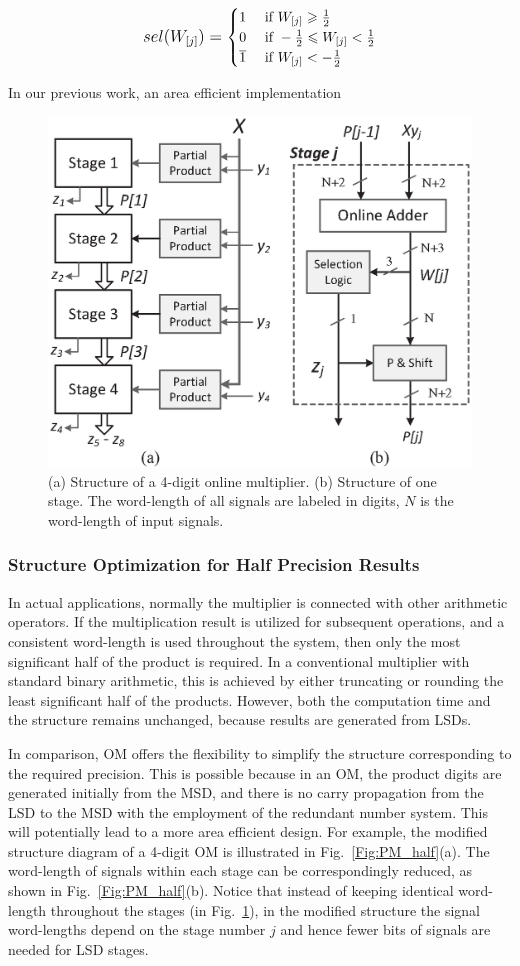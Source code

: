 \documentclass[10pt, conference, compsocconf]{IEEEtran}
\begin{document}
\begin{eqnarray}\label{Eq:SelFunc_OM}
\small
  sel(W_{[j]})=\begin{cases}
    1 & \text{ if } W_{[j]} \geqslant \frac{1}{2} \\
    0 & \text{ if } -\frac{1}{2}\leqslant W_{[j]}<\frac{1}{2} \\
    \overline{1} & \text{ if } W_{[j]}<-\frac{1}{2}
  \end{cases}
\normalsize
\end{eqnarray}

In our previous work, an area efficient implementation 

\begin{figure}[tbp]
  \centering
  \includegraphics[width=.42\textwidth]{./figures/ParallelMult_Structure.eps}
  \caption{(a) Structure of a 4-digit online multiplier. (b) Structure of one stage. The word-length of all signals are labeled in digits, $N$ is the word-length of input signals.}
    \vspace{-2ex}
  \label{Fig:PM}
\end{figure}

\subsubsection{Structure Optimization for Half Precision Results}
In actual applications, normally the multiplier is connected with other arithmetic operators. If the multiplication result is utilized for subsequent operations, and a consistent word-length is used throughout the system, then only the most significant half of the product is required. In a conventional multiplier with standard binary arithmetic, this is achieved by either truncating or rounding the least significant half of the products. However, both the computation time and the structure remains unchanged, because results are generated from LSDs.

In comparison, OM offers the flexibility to simplify the structure corresponding to the required precision. This is possible because in an OM, the product digits are generated initially from the MSD, and there is no carry propagation from the LSD to the MSD with the employment of the redundant number system. This will potentially lead to a more area efficient design. For example, the modified structure diagram of a 4-digit OM is illustrated in Fig.~\ref{Fig:PM_half}(a). The word-length of signals within each stage can be correspondingly reduced, as shown in Fig.~\ref{Fig:PM_half}(b). Notice that instead of keeping identical word-length throughout the stages (in Fig.~\ref{Fig:PM}), in the modified structure the signal word-lengths depend on the stage number $j$ and hence fewer bits of signals are needed for LSD stages.
\end{document}
